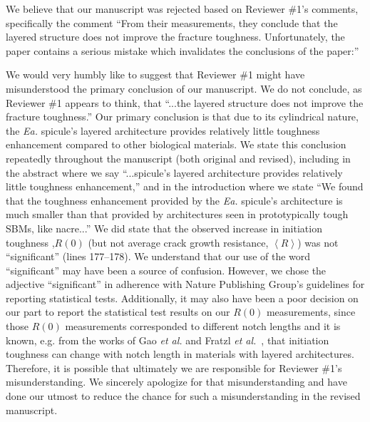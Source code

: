 \documentclass[11pt,letterpaper]{report}
\makeatletter
\newcommand{\EA}{\textit{Ea.\@}\xspace}
\makeatother
\begin{document}

We believe that our manuscript was rejected based on Reviewer \#1's comments, specifically the comment ``From their measurements, they conclude that the layered structure does not improve the fracture toughness. Unfortunately, the paper contains a serious mistake which invalidates the conclusions of the paper:''

We would very humbly like to suggest that Reviewer \#1 might have misunderstood the primary conclusion of our manuscript. We do not conclude, as Reviewer \#1 appears to think, that ``...the layered structure does not improve the fracture toughness.'' Our primary conclusion is that due to its cylindrical nature, the \EA spicule's layered architecture provides relatively little toughness enhancement compared to other biological materials. We state this conclusion repeatedly throughout the manuscript (both original and revised), including in the abstract where we say ``...spicule's layered architecture provides relatively little toughness enhancement,'' and in the introduction where we state ``We found that the toughness enhancement provided by the \EA spicule's architecture is much smaller than that provided by architectures seen in prototypically tough SBMs, like nacre...'' We did state that the observed increase in initiation toughness ,$R(0)$ (but not average crack growth resistance, $\left< R \right>$) was not ``significant'' (lines 177--178). We understand that our use of the word ``significant'' may have been a source of confusion. However, we chose the adjective ``significant'' in adherence with Nature Publishing Group's guidelines for reporting statistical tests. Additionally, it may also have been a poor decision on our part to report the statistical test results on our $R(0)$ measurements, since those $R(0)$ measurements corresponded to different notch lengths and it is known, e.g. from the works of Gao \textit{et al.} and Fratzl \textit{et al.}~\cite{huajian1991fracture,fratzl2007hindered, kolednik2014improvements, kolednik2011bioinspired}, that initiation toughness can change with notch length in materials with layered architectures. Therefore, it is possible that ultimately we are  responsible for Reviewer \#1's misunderstanding. We sincerely apologize for that misunderstanding and have done our utmost to reduce the chance for such a misunderstanding in the revised manuscript.
\end{document}
